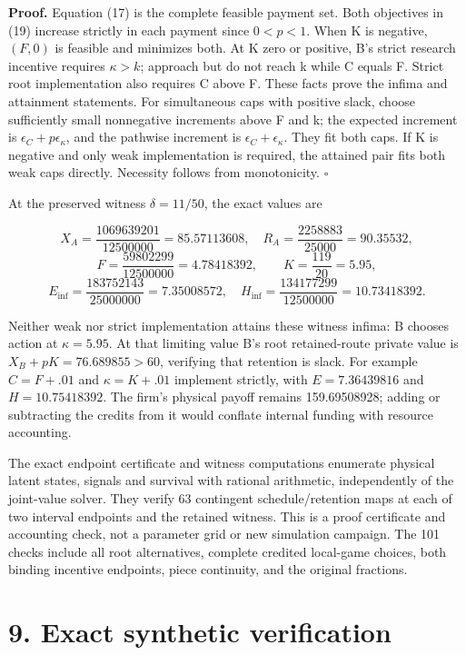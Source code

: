 \documentclass[
  11pt,
]{article}
\begin{document}
\textbf{Proof.} Equation (17) is the complete feasible payment set. Both
objectives in (19) increase strictly in each payment since \(0<p<1\).
When K is negative, \((F,0)\) is feasible and minimizes both. At K zero
or positive, B's strict research incentive requires \(\kappa>k\);
approach but do not reach k while C equals F. Strict root implementation
also requires C above F. These facts prove the infima and attainment
statements. For simultaneous caps with positive slack, choose
sufficiently small nonnegative increments above F and k; the expected
increment is \(\epsilon_C+p\epsilon_\kappa\), and the pathwise increment
is \(\epsilon_C+\epsilon_\kappa\). They fit both caps. If K is negative
and only weak implementation is required, the attained pair fits both
weak caps directly. Necessity follows from monotonicity. \(\square\)

At the preserved witness \(\delta=11/50\), the exact values are

\[X_A=\frac{1069639201}{12500000}=85.57113608,\quad
R_A=\frac{2258883}{25000}=90.35532,\]
\[F=\frac{59802299}{12500000}=4.78418392,\qquad K=\frac{119}{20}=5.95,\]
\[E_{\inf}=\frac{183752143}{25000000}=7.35008572,\quad
H_{\inf}=\frac{134177299}{12500000}=10.73418392. \tag{21}\]

Neither weak nor strict implementation attains these witness infima: B
chooses action at \(\kappa=5.95\). At that limiting value B's root
retained-route private value is \(X_B+pK=76.689855>60\), verifying that
retention is slack. For example \(C=F+.01\) and \(\kappa=K+.01\)
implement strictly, with \(E=7.36439816\) and \(H=10.75418392\). The
firm's physical payoff remains 159.69508928; adding or subtracting the
credits from it would conflate internal funding with resource
accounting.

The exact endpoint certificate and witness computations enumerate
physical latent states, signals and survival with rational arithmetic,
independently of the joint-value solver. They verify 63 contingent
schedule/retention maps at each of two interval endpoints and the
retained witness. This is a proof certificate and accounting check, not
a parameter grid or new simulation campaign. The 101 checks include all
root alternatives, complete credited local-game choices, both binding
incentive endpoints, piece continuity, and the original fractions.

\section{9. Exact synthetic
verification}\label{exact-synthetic-verification}
\end{document}
